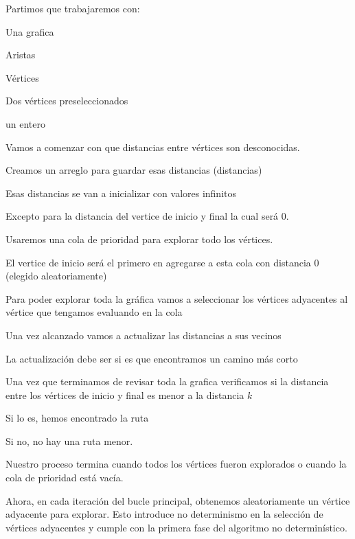 \begin{myitemize}
    \item Partimos que trabajaremos con:
    \begin{myitemize}
        \item Una grafica
        \item Aristas
        \item Vértices
        \item Dos vértices preseleccionados 
        \item un entero
    \end{myitemize}

    \item Vamos a comenzar con que distancias entre vértices son desconocidas. 
    \item Creamos un arreglo para guardar esas distancias (distancias) 
    \item Esas distancias se van a inicializar con valores infinitos 
    \item Excepto para la distancia del vertice de inicio y final la cual será 0.

    \item Usaremos una cola de prioridad para explorar todo los vértices. 
    \item El vertice de inicio será el primero en agregarse a esta cola con distancia 0 (elegido aleatoriamente)
    
    \item Para poder explorar toda la gráfica vamos a seleccionar los vértices adyacentes al vértice que 
    tengamos evaluando en la cola 
    \item Una vez alcanzado vamos a actualizar las distancias a sus vecinos 
    \item La actualización debe ser si es que encontramos un camino más corto
        
    \item Una vez que terminamos de revisar toda la grafica verificamos si la distancia entre los vértices de 
        inicio y final es menor a la distancia $k$
    \item Si lo es, hemos encontrado la ruta
    \item Si no, no hay una ruta menor.
    \item Nuestro proceso termina cuando todos los vértices fueron explorados o cuando la cola de prioridad está vacía.
\end{myitemize}

Ahora, en cada iteración del bucle principal, obtenemos aleatoriamente un vértice adyacente para explorar. Esto introduce no 
determinismo en la selección de vértices adyacentes y cumple con la primera fase del algoritmo no determinístico. 
